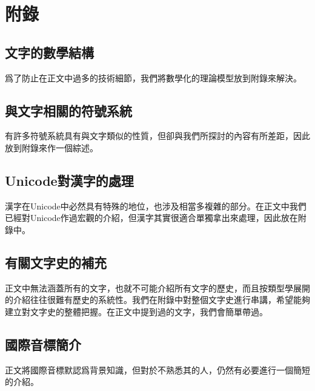 \chapter{附錄}

\begingroup
\renewcommand{\thesection}{\Alph{section}}
\renewcommand{\thesubsection}{\thesection.\arabic{subsection}}
\setcounter{section}{0}

\section{文字的數學結構}
爲了防止在正文中過多的技術細節，我們將數學化的理論模型放到附錄來解決。

\section{與文字相關的符號系統}
有許多符號系統具有與文字類似的性質，但卻與我們所探討的內容有所差距，因此放到附錄來作一個綜述。

\section{Unicode對漢字的處理}
漢字在Unicode中必然具有特殊的地位，也涉及相當多複雜的部分。在正文中我們已經對Unicode作過宏觀的介紹，但漢字其實很適合單獨拿出來處理，因此放在附錄中。

\section{有關文字史的補充}
正文中無法涵蓋所有的文字，也就不可能介紹所有文字的歷史，而且按類型學展開的介紹往往很難有歷史的系統性。我們在附錄中對整個文字史進行串講，希望能夠
建立對文字史的整體把握。在正文中提到過的文字，我們會簡單帶過。

\section{國際音標簡介}
正文將國際音標默認爲背景知識，但對於不熟悉其的人，仍然有必要進行一個簡短的介紹。

\endgroup

